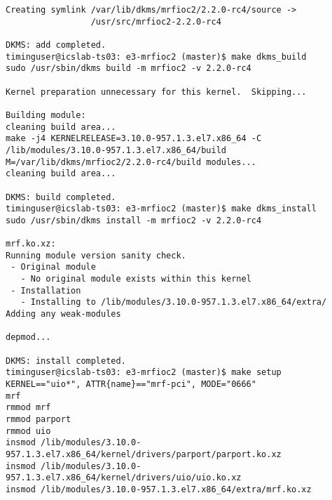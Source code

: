\documentclass[11pt
  , a4paper
  , article
  , oneside
  , showtrims
]{memoir}
\begin{document}
{\begin{itemize}
\begin{lstlisting}[style=termstyle]
Creating symlink /var/lib/dkms/mrfioc2/2.2.0-rc4/source ->
                 /usr/src/mrfioc2-2.2.0-rc4

DKMS: add completed.
timinguser@icslab-ts03: e3-mrfioc2 (master)$ make dkms_build
sudo /usr/sbin/dkms build -m mrfioc2 -v 2.2.0-rc4

Kernel preparation unnecessary for this kernel.  Skipping...

Building module:
cleaning build area...
make -j4 KERNELRELEASE=3.10.0-957.1.3.el7.x86_64 -C /lib/modules/3.10.0-957.1.3.el7.x86_64/build M=/var/lib/dkms/mrfioc2/2.2.0-rc4/build modules...
cleaning build area...

DKMS: build completed.
timinguser@icslab-ts03: e3-mrfioc2 (master)$ make dkms_install
sudo /usr/sbin/dkms install -m mrfioc2 -v 2.2.0-rc4

mrf.ko.xz:
Running module version sanity check.
 - Original module
   - No original module exists within this kernel
 - Installation
   - Installing to /lib/modules/3.10.0-957.1.3.el7.x86_64/extra/
Adding any weak-modules

depmod...

DKMS: install completed.
timinguser@icslab-ts03: e3-mrfioc2 (master)$ make setup
KERNEL=="uio*", ATTR{name}=="mrf-pci", MODE="0666"
mrf
rmmod mrf
rmmod parport
rmmod uio
insmod /lib/modules/3.10.0-957.1.3.el7.x86_64/kernel/drivers/parport/parport.ko.xz
insmod /lib/modules/3.10.0-957.1.3.el7.x86_64/kernel/drivers/uio/uio.ko.xz
insmod /lib/modules/3.10.0-957.1.3.el7.x86_64/extra/mrf.ko.xz



\end{lstlisting}
\end{itemize}}
\end{document}
